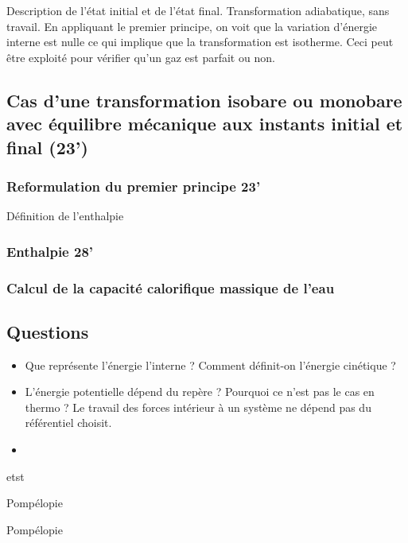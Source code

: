 Description de l'état initial et de l'état final.
Transformation adiabatique, sans travail.
En appliquant le premier principe, on voit que la variation d'énergie interne est nulle ce qui implique que la transformation est isotherme.
Ceci peut être exploité pour vérifier qu'un gaz est parfait ou non.

\subsection{Cas d'une transformation isobare ou monobare avec équilibre mécanique aux instants initial et final (23')}

\subsubsection{Reformulation du premier principe 23'}

Définition de l'enthalpie

\subsubsection{Enthalpie 28'}

\subsubsection{Calcul de la capacité calorifique massique de l'eau}

\subsection{Questions}

\begin{itemize}
\item Que représente l'énergie l'interne ?  Comment définit-on l'énergie cinétique ?
\item L'énergie potentielle dépend du repère ? Pourquoi ce n'est pas le cas en thermo ? Le travail des forces intérieur à un système ne dépend pas du référentiel choisit.
\item
\end{itemize}

\begin{experience}
etst
\end{experience}

\begin{transition}
Pompélopie
\end{transition}
\begin{remarque}
Pompélopie
\end{remarque}
